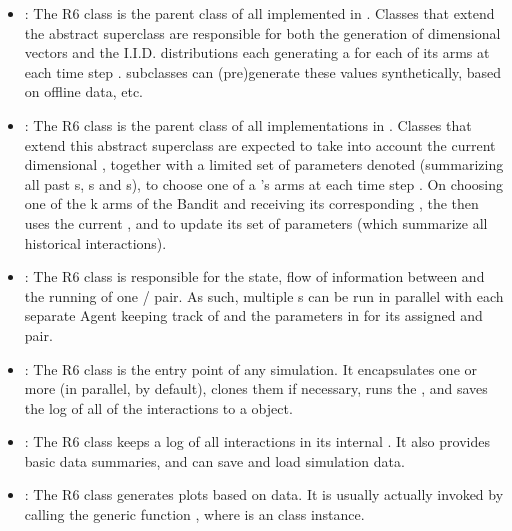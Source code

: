 \documentclass{jss}\usepackage[]{graphicx}\usepackage[]{color}
\begin{document}
\begin{itemize}
         \item {}: The R6 class  is the parent class of all  implemented in . Classes that extend the abstract superclass  are responsible for both the generation of  dimensional  vectors  and the  I.I.D. distributions each generating a  for each of its  arms at each time step .  subclasses can (pre)generate these values synthetically, based on offline data, etc.

         \item {}: The R6 class  is the parent class of all  implementations in . Classes that extend this abstract  superclass are expected to take into account the current  dimensional , together with a limited set of parameters denoted  (summarizing all past s, s and s), to choose one of a 's arms at each time step . On choosing one of the {k} arms of the Bandit and receiving its corresponding , the  then uses the current ,  and  to update its set of parameters  (which summarize all historical interactions).

         \item {}: The R6 class  is responsible for the state, flow of information between and the running of one / pair. As such, multiple s can be run in parallel with each separate Agent keeping track of  and the parameters in  for its assigned  and  pair.

         \item {}: The R6 class  is the entry point of any  simulation. It encapsulates one or more  (in parallel, by default), clones them if necessary, runs the , and saves the log of all of the  interactions to a  object.

         \item {}: The R6 class  keeps a log of all  interactions in its internal . It also provides basic data summaries, and can save and load simulation data.

         \item {}: The R6 class  generates plots based on  data. It is usually actually invoked by calling the generic function , where  is an  class instance.
\end{itemize}
\end{document}
